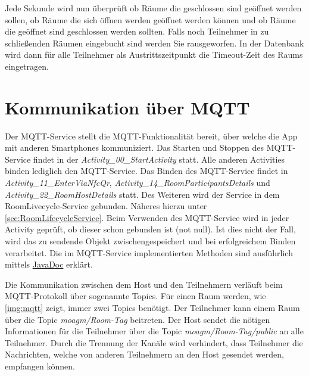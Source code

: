 Jede Sekunde wird nun überprüft ob Räume die geschlossen sind geöffnet werden sollen, ob Räume die sich öffnen werden geöffnet werden können und ob Räume die geöffnet sind geschlossen werden sollten. 
Falls noch Teilnehmer in zu schließenden Räumen eingebucht sind werden Sie rausgeworfen. In der Datenbank wird dann für alle Teilnehmer als Austrittszeitpunkt die Timeout-Zeit des Raums eingetragen.



\section{Kommunikation über MQTT}
\label{sec:MQTT Service}
Der MQTT-Service stellt die MQTT-Funktionalität bereit, über welche die App mit anderen Smartphones kommuniziert.
Das Starten und Stoppen des MQTT-Service findet in der \textit{Activity\_00\_StartActivity} statt. 
Alle anderen Activities binden lediglich den MQTT-Service. Das Binden des MQTT-Service findet in  \textit{Activity\_11\_EnterViaNfcQr}, \textit{Activity\_14\_RoomParticipantsDetails} und \textit{Activity\_22\_RoomHostDetails} statt. 
Des Weiteren wird der Service in dem RoomLivecycle-Service gebunden. 
Näheres hierzu unter \cref{sec:RoomLifecycleService}.  
Beim Verwenden des MQTT-Service wird in jeder Activity geprüft, ob dieser schon gebunden ist (not null). 
Ist dies nicht der Fall, wird das zu sendende Objekt zwischengespeichert und bei erfolgreichem Binden verarbeitet. 
Die im MQTT-Service implementierten Methoden sind ausführlich mittels \href{https://scm.inftech.hs-mannheim.de/gogs/moa/20moagm/src/dev/Doku/javadoc}{JavaDoc} erklärt. 

Die Kommunikation zwischen dem Host und den Teilnehmern verläuft beim MQTT-Protokoll über sogenannte Topics. 
Für einen Raum werden, wie \cref{img:mqtt} zeigt, immer zwei Topics benötigt. 
Der Teilnehmer kann einem Raum über die Topic \textit{moagm/Room-Tag} beitreten. 
Der Host sendet die nötigen Informationen für die Teilnehmer über die Topic \textit{moagm/Room-Tag/public} an alle Teilnehmer. 
Durch die Trennung der Kanäle wird verhindert, dass Teilnehmer die Nachrichten, welche von anderen Teilnehmern an den Host gesendet werden, empfangen können.

